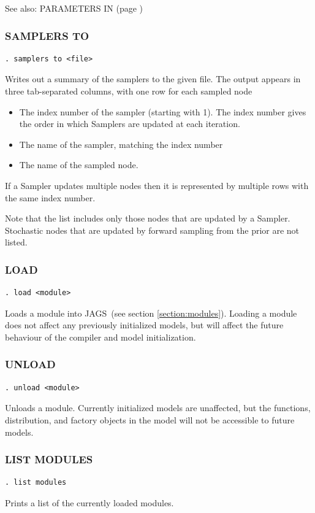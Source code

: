 \documentclass[11pt, a4paper, titlepage]{report}
\newcommand{\JAGS}{\textsf{JAGS}}
\begin{document}
See also: PARAMETERS IN (page \pageref{parameters:in})

\subsubsection{SAMPLERS TO}
\label{samplers:to}
\begin{verbatim}
. samplers to <file>
\end{verbatim}
Writes out a summary of the samplers to the given file.  The output appears
in three tab-separated columns, with one row for each sampled node
\begin{itemize}
\item The index number of the sampler (starting with 1). The index number 
gives the order in which Samplers are updated at each iteration.
\item The name of the sampler, matching the index number
\item The name of the sampled node. 
\end{itemize}
If a Sampler updates multiple nodes then it is represented by multiple rows
with the same index number.

Note that the list includes only those nodes that are updated by a
Sampler.  Stochastic nodes that are updated by forward sampling from
the prior are not listed.

\subsubsection{LOAD}
\label{load}
\begin{verbatim}
. load <module>
\end{verbatim}
Loads a module into \JAGS\ (see section \ref{section:modules}). Loading
a module does not affect any previously initialized models, but will
affect the future behaviour of the compiler and model initialization.

\subsubsection{UNLOAD}
\label{unload}
\begin{verbatim}
. unload <module>
\end{verbatim}
Unloads a module. Currently initialized models are unaffected, but
the functions, distribution, and factory objects in the model will not
be accessible to future models.

\subsubsection{LIST MODULES}
\label{list:modules}
\begin{verbatim}
. list modules
\end{verbatim}
Prints a list of the currently loaded modules.
\end{document}
